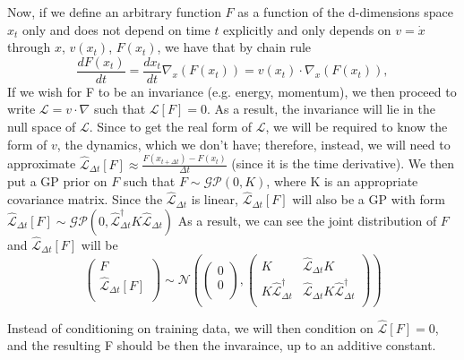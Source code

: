\documentclass{article}
\begin{document}
Now, if we define an arbitrary function $F$ as a function of the d-dimensions space $x_t$ only and does not depend on time $t$ explicitly and only depends on $v=\dot{x}$ through $x$, $v(x_t)$, $F(x_t)$, we have that by chain rule 
$$\frac{dF(x_t)}{dt} = \frac{dx_t}{dt} \nabla_x (F(x_t)) = v(x_t)\cdot\nabla_x(F(x_t)),$$
If we wish for F to be an invariance (e.g. energy, momentum), we then proceed to write $\mathcal{L} = v\cdot\nabla$ such that $\mathcal{L}[F]=0$.
As a result, the invariance will lie in the null space of $\mathcal{L}$.
Since to get the real form of $\mathcal{L}$, we will be required to know the form of $v$, the dynamics, which we don't have; therefore, instead, we will need to approximate $\hat{\mathcal{L}}_{\Delta t}[F] \approx \frac{F(x_{t+\Delta t})-F(x_t)}{\Delta t}$ (since it is the time derivative).
We then put a GP prior on $F$ such that $F\sim\mathcal{GP}(0, K)$, where K is an appropriate covariance matrix.
Since the $\hat{\mathcal{L}}_{\Delta t}$ is linear, $\hat{\mathcal{L}}_{\Delta t}[F]$ will also be a GP with form $\hat{\mathcal{L}}_{\Delta t}[F]\sim \mathcal{GP}(0, \hat{\mathcal{L}}_{\Delta t}^{\dagger}K\hat{\mathcal{L}}_{\Delta t})$ 
As a result, we can see the joint distribution of $F$ and $\hat{\mathcal{L}}_{\Delta t}[F]$ will be
\begin{equation*}
  \begin{pmatrix}
    F\\
    \hat{\mathcal{L}}_{\Delta t}[F]\\
  \end{pmatrix}
  \sim
  \mathcal{N}
  \left(
  \begin{pmatrix}
      0\\
      0\\
  \end{pmatrix}
  ,
  \begin{pmatrix}
    K & \hat{\mathcal{L}}_{\Delta t}K \\
    K\hat{\mathcal{L}}_{\Delta t}^\dagger & \hat{\mathcal{L}}_{\Delta t} K \hat{\mathcal{L}}_{\Delta t}^\dagger\\
  \end{pmatrix}
  \right)
\end{equation*}

Instead of conditioning on training data, we will then condition on $\hat{\mathcal{L}}[F]=0$, and the resulting F should be then the invaraince, up to an additive constant. 
\end{document}
